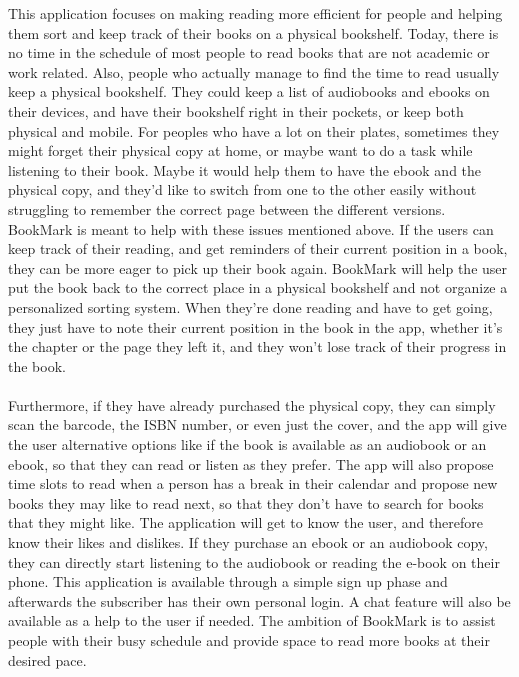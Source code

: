 \documentclass[conference]{IEEEtran}
\begin{document}
This application focuses on making reading more efficient for people and helping them sort and keep track of their books on a physical bookshelf. Today, there is no time in the schedule of most people to read books that are not academic or work related. Also, people who actually manage to find the time to read usually keep a physical bookshelf. They could keep a list of audiobooks and ebooks on their devices, and have their bookshelf right in their pockets, or keep both physical and mobile. For peoples who have a lot on their plates, sometimes they might forget their physical copy at home, or maybe want to do a task while listening to their book. Maybe it would help them to have the ebook and the physical copy, and they'd like to switch from one to the other easily without struggling to remember the correct page between the different versions.\\
BookMark is meant to help with these issues mentioned above. If the users can keep track of their reading, and get reminders of their current position in a book, they can be more eager to pick up their book again. BookMark will help the user put the book back to the correct place in a physical bookshelf and not organize a personalized sorting system. When they're done reading and have to get going, they just have to note their current position in the book in the app, whether it's the chapter or the page they left it, and they won't lose track of their progress in the book. \\ \\

Furthermore, if they have already purchased the physical copy, they can simply scan the barcode, the ISBN number, or even just the cover, and the app will give the user alternative options like if the book is available as an audiobook or an ebook, so that they can read or listen as they prefer. The app will also propose time slots to read when a person has a break in their calendar and propose new books they may like to read next, so that they don’t have to search for books that they might like. The application will get to know the user, and therefore know their likes and dislikes. If they purchase an ebook or an audiobook copy, they can directly start listening to the audiobook or reading the e-book on their phone. This application is available through a simple sign up phase and afterwards the subscriber has their own personal login. A chat feature will also be available as a help to the user if needed. The ambition of BookMark is to assist people with their busy schedule and provide space to read more books at their desired pace.
\end{document}
